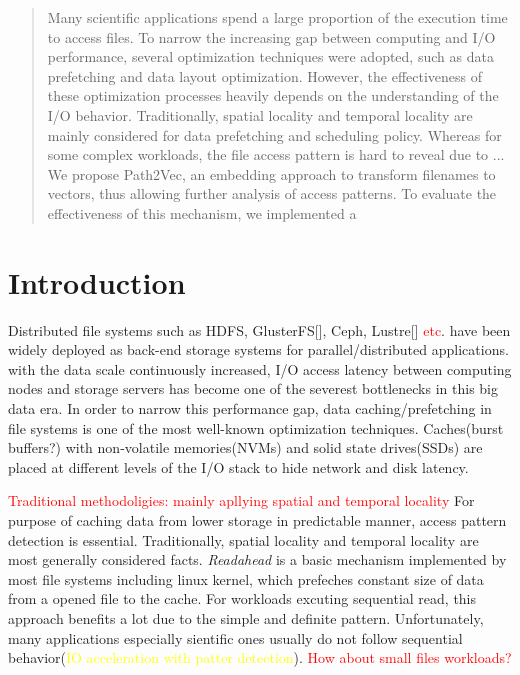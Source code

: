 \documentclass[conference]{IEEEtran}
\begin{document}
\begin{abstract}
    Many scientific applications spend a large proportion of the execution time to access files. 
    To narrow the increasing gap between computing and I/O performance, several optimization techniques were adopted, 
    such as data prefetching and data layout optimization. However, the effectiveness of these optimization processes heavily 
    depends on the understanding of the I/O behavior. Traditionally, spatial locality and temporal locality
    are mainly considered for data prefetching and scheduling policy. Whereas for some complex workloads, the file access pattern 
    is hard to reveal due to ... 
    We propose Path2Vec, an embedding approach to transform filenames to vectors, thus allowing further analysis of access patterns. 
    To evaluate the effectiveness of this mechanism, we implemented a 

\end{abstract}

\begin{IEEEkeywords}

\end{IEEEkeywords}

\section{Introduction}
Distributed file systems such as HDFS\cite{HDFS}, GlusterFS[], Ceph\cite{Ceph}, Lustre[] \textcolor{red}{etc}. have been widely deployed as back-end storage systems for parallel/distributed applications.
with the data scale continuously increased, I/O access latency between computing nodes and storage servers has become one of the severest bottlenecks in this big data era.
In order to narrow this performance gap, data caching/prefetching in file systems is one of the most well-known optimization techniques.
Caches(burst buffers?) with non-volatile memories(NVMs) and solid state drives(SSDs) are placed at different levels of the I/O stack to hide network and disk latency.

\textcolor{red}{Traditional methodoligies: mainly apllying spatial and temporal locality}
For purpose of caching data from lower storage in predictable manner, access pattern detection is essential.
Traditionally, spatial locality and temporal locality are most generally considered facts. 
\textit{Readahead} is a basic mechanism implemented by most file systems\cite{WhyDoes} including linux kernel, which prefeches constant size of data from a opened file to the cache. 
For workloads excuting sequential read, this approach benefits a lot due to the simple and definite pattern.
Unfortunately, many applications especially sientific ones usually do not follow sequential behavior(\textcolor{yellow}{IO acceleration with patter detection}). 
\textcolor{red}{How about small files workloads?}
\end{document}
